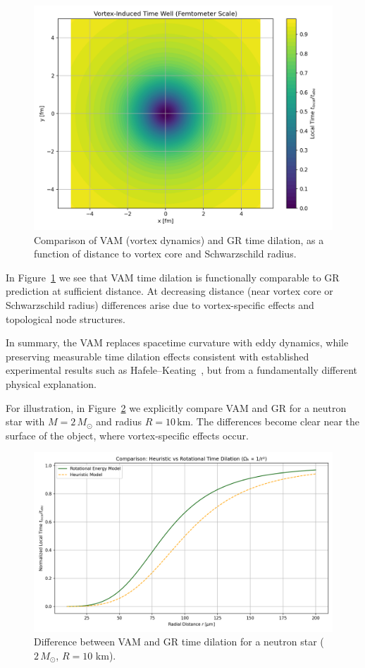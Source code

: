 \begin{figure}[ht!]
    \centering
    \includegraphics[width=0.7\linewidth]{images/02-RadialProfileOfLocalTimeDilation_Vortex-Induced_Time_Well}
    \caption{Comparison of VAM (vortex dynamics) and GR time dilation, as a function of distance to vortex core and Schwarzschild radius.}
    \label{fig:vergelijking_VAMGR}
\end{figure}

In Figure~\ref{fig:vergelijking_VAMGR} we see that VAM time dilation is functionally comparable to GR prediction at sufficient distance. At decreasing distance (near vortex core or Schwarzschild radius) differences arise due to vortex-specific effects and topological node structures.

In summary, the VAM replaces spacetime curvature with eddy dynamics, while preserving measurable time dilation effects consistent with established experimental results such as Hafele–Keating~\cite{hafele1972around}, but from a fundamentally different physical explanation.

For illustration, in Figure~\ref{fig:comparisonVAMGR} we explicitly compare VAM and GR for a neutron star with $M = 2\,M_\odot$ and radius $R = 10\,\text{km}$. The differences become clear near the surface of the object, where vortex-specific effects occur.

\begin{figure}[ht!]
    \centering
    \includegraphics[width=0.7\linewidth]{images/04-RotationalVsHeuristicTimeDilation}
    \caption{Difference between VAM and GR time dilation for a neutron star ($2\,M_\odot$, $R=10$ km).}
    \label{fig:comparisonVAMGR}
\end{figure}

